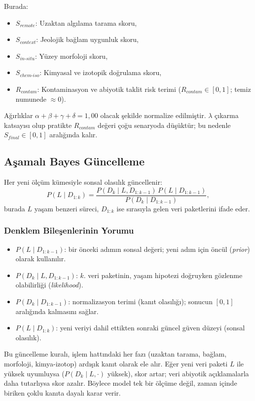 \documentclass[12pt,a4paper]{article}
\begin{document}
Burada:
\begin{itemize}
    \item $S_{remote}$: Uzaktan algılama tarama skoru,
    \item $S_{context}$: Jeolojik bağlam uygunluk skoru,
    \item $S_{in\text{-}situ}$: Yüzey morfoloji skoru,
    \item $S_{chem\text{-}iso}$: Kimyasal ve izotopik doğrulama skoru,
    \item $R_{contam}$: Kontaminasyon ve abiyotik taklit risk terimi ($R_{contam}\in[0,1]$; temiz numunede $\approx 0$).
\end{itemize}
Ağırlıklar $\alpha+\beta+\gamma+\delta=1{,}00$ olacak şekilde normalize edilmiştir. $\lambda$ çıkarma katsayısı olup pratikte $R_{contam}$ değeri çoğu senaryoda düşüktür; bu nedenle $S_{final}\in[0,1]$ aralığında kalır.

\subsection{Aşamalı Bayes Güncelleme}
Her yeni ölçüm kümesiyle sonsal olasılık güncellenir:
\begin{equation}
P(L \mid D_{1:k}) = \frac{P(D_k \mid L, D_{1:k-1})\,P(L \mid D_{1:k-1})}{P(D_k \mid D_{1:k-1})},
\end{equation}
burada $L$ yaşam benzeri süreci, $D_{1:k}$ ise sırasıyla gelen veri paketlerini ifade eder.

\subsubsection*{Denklem Bileşenlerinin Yorumu}
\begin{itemize}
    \item $P(L \mid D_{1:k-1})$: bir önceki adımın sonsal değeri; yeni adım için öncül (\textit{prior}) olarak kullanılır.
    \item $P(D_k \mid L, D_{1:k-1})$: $k$. veri paketinin, yaşam hipotezi doğruyken gözlenme olabilirliği (\textit{likelihood}).
    \item $P(D_k \mid D_{1:k-1})$: normalizasyon terimi (kanıt olasılığı); sonucun $[0,1]$ aralığında kalmasını sağlar.
    \item $P(L \mid D_{1:k})$: yeni veriyi dahil ettikten sonraki güncel güven düzeyi (sonsal olasılık).
\end{itemize}

Bu güncelleme kuralı, işlem hattındaki her fazı (uzaktan tarama, bağlam, morfoloji, kimya-izotop) ardışık kanıt olarak ele alır. Eğer yeni veri paketi $L$ ile yüksek uyumluysa ($P(D_k\mid L,\cdot)$ yüksek), skor artar; veri abiyotik açıklamalarla daha tutarlıysa skor azalır. Böylece model tek bir ölçüme değil, zaman içinde biriken çoklu kanıta dayalı karar verir.
\end{document}
